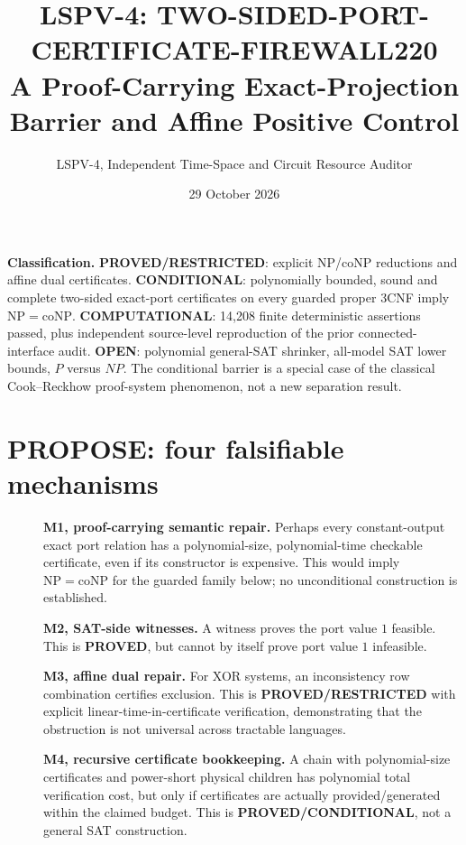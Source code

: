 \documentclass[11pt]{article}
\title{LSPV-4: TWO-SIDED-PORT-CERTIFICATE-FIREWALL220\\A Proof-Carrying Exact-Projection Barrier and Affine Positive Control}
\author{LSPV-4, Independent Time-Space and Circuit Resource Auditor}
\date{29 October 2026}
\begin{document}
\maketitle
\noindent\textbf{Classification.} \textbf{PROVED/RESTRICTED}: explicit NP/coNP reductions and affine dual certificates. \textbf{CONDITIONAL}: polynomially bounded, sound and complete two-sided exact-port certificates on every guarded proper 3CNF imply $\mathrm{NP}=\mathrm{coNP}$. \textbf{COMPUTATIONAL}: 14,208 finite deterministic assertions passed, plus independent source-level reproduction of the prior connected-interface audit. \textbf{OPEN}: polynomial general-SAT shrinker, all-model SAT lower bounds, $P$ versus $NP$. The conditional barrier is a special case of the classical Cook--Reckhow proof-system phenomenon, not a new separation result.

\section{PROPOSE: four falsifiable mechanisms}
\begin{description}
\item[]\textbf{M1, proof-carrying semantic repair.} Perhaps every constant-output exact port relation has a polynomial-size, polynomial-time checkable certificate, even if its constructor is expensive. This would imply $\mathrm{NP}=\mathrm{coNP}$ for the guarded family below; no unconditional construction is established.
\item[]\textbf{M2, SAT-side witnesses.} A witness proves the port value $1$ feasible. This is \textbf{PROVED}, but cannot by itself prove port value $1$ infeasible.
\item[]\textbf{M3, affine dual repair.} For XOR systems, an inconsistency row combination certifies exclusion. This is \textbf{PROVED/RESTRICTED} with explicit linear-time-in-certificate verification, demonstrating that the obstruction is not universal across tractable languages.
\item[]\textbf{M4, recursive certificate bookkeeping.} A chain with polynomial-size certificates and power-short physical children has polynomial total verification cost, but only if certificates are actually provided/generated within the claimed budget. This is \textbf{PROVED/CONDITIONAL}, not a general SAT construction.
\end{description}
\end{document}
